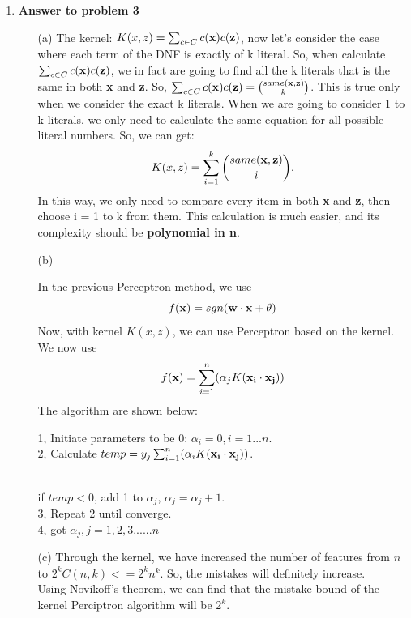 \begin{enumerate}
\item {\bf Answer to problem 3}
\begin{enumerate}
\item[(a)]
The kernel: $K(x, z) = \sum_{c \in C} c({\bf x}) c({\bf z})$, now let's consider the case where each term of the DNF is exactly of k literal. So, when calculate  $\sum_{c \in C} c({\bf x}) c({\bf z})$, we in fact are going to find all the k literals that is the same in both {\bf x} and {\bf z}. So, $\sum_{c \in C} c({\bf x}) c({\bf z}) = {same({\bf x},{\bf z}) \choose k}$. This is true only when we consider the exact k literals. When we are going to consider 1 to k literals, we only need to calculate the same equation for all possible literal numbers. So, we can get: $$K(x, z) = \sum_{i = 1}^{k}{same({\bf x},{\bf z}) \choose i}.$$ In this way, we only need to compare every item in both {\bf x} and {\bf z}, then choose i = 1 to k from them. This calculation is much easier, and its complexity should be {\bf polynomial in n}.\\

\item[(b)]

In the previous Perceptron method, we use $$f({\bf x}) = sgn({\bf w \cdot x} + \theta)$$
Now, with kernel $K(x, z)$, we can use Perceptron based on the kernel. We now use $$f({\bf x}) = \sum_{i = 1}^n (\alpha_j K({\bf x_i} \cdot {\bf x_j}))$$ The algorithm are shown below:
\begin{algorithm}
1, Initiate parameters to be 0: $\alpha_i = 0, i = 1 ... n$. \\

2, Calculate $temp = y_j \sum_{i = 1}^n (\alpha_i K({\bf x_i} \cdot {\bf x_j}))$.\\\

\qquad \qquad if $temp < 0$, add 1 to $\alpha_j$,  $\alpha_j = \alpha_j + 1$.\\

3, Repeat 2 until converge.\\

4, got $\alpha_j, j = 1, 2, 3 ...... n $\\

\end{algorithm}

\item[(c)]
Through the kernel, we have increased the number of features from $n$ to $2^kC(n, k) <= 2^kn^k$. So, the mistakes will definitely increase.\\

Using Novikoff's theorem, we can find that the mistake bound of the kernel Perciptron algorithm will be $2^k$.\\

\end{enumerate}

\end{enumerate}



